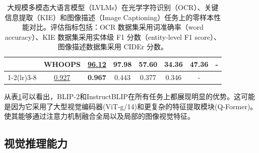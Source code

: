 \documentclass{article}
\begin{document}
\begin{table}[h!]
{\begin{tabular}{c|c|cccccc}
& WHOOPS & \underline{96.12} & \textbf{97.98} &  57.60 &  34.36 &  47.36 & - \\
\cmidrule(lr){1-2}\cmidrule(lr){3-8}
\multicolumn{2}{c|}{Average Score} & \underline{0.927} & \textbf{0.967} & 0.443 & 0.377 & 0.346 & - \\
\bottomrule
\end{tabular}}
\caption{大规模多模态大语言模型（LVLMs）在光学字符识别（OCR）、关键信息提取（KIE）和图像描述（Image Captioning）任务上的零样本性能对比。评估指标包括：OCR 数据集采用词准确率（word accuracy）、KIE 数据集采用实体级 F1 分数（entity-level F1 score）、图像描述数据集采用 CIDEr 分数。}
\label{tab:vka_results}
\end{table}

从表\ref{tab:vka_results}可以看出，BLIP-2和InstructBLIP在所有任务上都展现明显的优势。这可能是因为它采用了大型视觉编码器(ViT-g/14)和更复杂的特征提取模块(Q-Former)。使其能够通过注意力机制融合全局以及局部的图像视觉特征。

\subsection{视觉推理能力}
\end{document}

